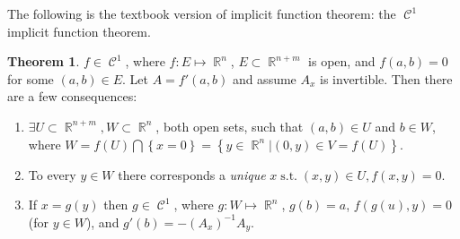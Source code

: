 \documentclass{amsart} %
\theoremstyle{mytheoremstyle}
\theoremstyle{definition}
\newtheorem{theorem}[definition]{Theorem}
\numberwithin{equation}{section}
\DeclareMathOperator{\R}{\mathbb{R}}
\DeclareMathOperator{\1}{\mathbbm{1}}
\DeclareMathOperator{\suchthat}{\text{ s.t. }}
\DeclareMathOperator{\contf}{\mathcal{C}}
\begin{document}
The following is the textbook version of implicit function theorem: the $\contf^1 $ implicit function theorem.

\begin{theorem}
	\label{thmimplicitfunctionC1}
	$f \in \contf^1$, where $f : E \mapsto \R^n$, $E \subset \R^{n+m} $ is open, and $f(a,b)=0$ for some $(a,b) \in E$. Let $A = f'(a,b)$ and assume $A_x $ is invertible. Then there are a few consequences:
	\begin{enumerate}[label=(\arabic*)]
		\item $\exists U \subset \R^{n+m}, W \subset \R^n$, both open sets, such that $(a,b) \in U$ and $b \in W$, where 
		$W = f(U) \bigcap \left\{x=0\right\} = \left\{ y \in \R^n | (0,y) \in V = f(U) \right\}$.
		\item To every $y \in W$ there corresponds a \textit{unique} $x \suchthat (x,y) \in U, f(x,y)=0$.
		\item If $x = g(y)$ then $g \in \contf^1$, where $g: W \mapsto \R^n$, $g(b)=a$, $f(g(u),y) = 0$ (for $y \in W$), and $g'(b) = -(A_x)^{-1} A_y$. 
	\end{enumerate}
\end{theorem}
\end{document}

